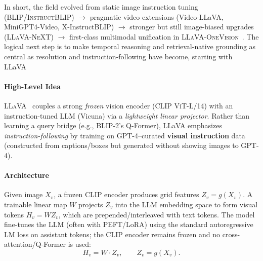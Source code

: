 \begin{enrichment}
\begin{enrichment}
        \noindent In short, the field evolved from static image instruction tuning (\textsc{BLIP}/\textsc{InstructBLIP}) $\rightarrow$ pragmatic video extensions (Video-LLaVA, MiniGPT4-Video, X-InstructBLIP) $\rightarrow$ stronger but still image-biased upgrades (\textsc{LLaVA-NeXT}) $\rightarrow$ first-class multimodal unification in \textsc{LLaVA-OneVision}~\cite{liu2023_llava,liu2024_llava_next,li2024_llavaonevision}. The logical next step is to make temporal reasoning and retrieval-native grounding as central as resolution and instruction-following have become, starting with LLaVA~\cite{liu2023_llava}
        
    \end{enrichment}
    
    \newpage
    
    \begin{enrichment}
        \label{enr:subsec_chapter24_llava}
        
        \paragraph{High-Level Idea}
        \textsc{LLaVA}~\cite{liu2023_llava} couples a strong \emph{frozen} vision encoder (CLIP ViT-L/14) with an instruction-tuned LLM (Vicuna) via a \emph{lightweight linear projector}. Rather than learning a query bridge (e.g., BLIP-2's Q-Former), LLaVA emphasizes \emph{instruction-following} by training on GPT-4–curated \textbf{visual instruction} data (constructed from captions/boxes but generated without showing images to GPT-4).
        
        \paragraph{Architecture}
        Given image $X_v$, a frozen CLIP encoder produces grid features $Z_v=g(X_v)$. A trainable linear map $W$ projects $Z_v$ into the LLM embedding space to form visual tokens $H_v=WZ_v$, which are prepended/interleaved with text tokens. The model fine-tunes the LLM (often with PEFT/LoRA) using the standard autoregressive LM loss on assistant tokens; the CLIP encoder remains frozen and no cross-attention/Q-Former is used:
        \[
        H_v = W \cdot Z_v,\qquad Z_v = g(X_v).
        \]
        

\end{enrichment}
\end{enrichment}
